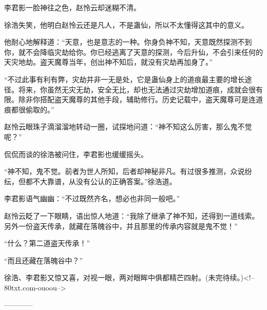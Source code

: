 \begin{this_body}
李君影一脸神往之色，赵怜云却迷糊不清。

徐浩失笑，他明白赵怜云还是凡人，不是蛊仙，所以不太懂得这其中的意义。

他耐心地解释道：“天意，也是意志的一种。你身负神不知，天意既然探测不到你，就不会降临灾劫给你。你已经逃离了天意的探测，今后升仙，不会引来任何的天灾地劫。盗天魔尊当年，创出神不知后，就没有灾劫再加身了。”

“不过此事有利有弊，灾劫并非一无是处，它是蛊仙身上的道痕最主要的增长途径。将来，你虽然无灾无劫，安全无比，却也无法通过灾劫增加道痕，成就会很有限。除非你搭配盗天魔尊的其他手段，辅助修行。历史记载中，盗天魔尊可是连道痕都很偷取的。”

赵怜云眼珠子滴溜溜地转动一圈，试探地问道：“神不知这么厉害，那么鬼不觉呢？”

侃侃而谈的徐浩被问住，李君影也缓缓摇头。

“神不知，鬼不觉。前者为世人所知，后者却神秘非凡。有过很多推测，众说纷纭，但都不大靠谱，从没有公认的正确答案。”徐浩道。

李君影语气幽幽：“不过既然齐名，想必也非同一般吧。”

赵怜云眨了一下眼睛，语出惊人地道：“我除了继承了神不知，还得到一道线索。另外一份盗天传承，就藏在落魄谷中，并且那里的传承内容就是鬼不觉！”

“什么？第二道盗天传承！”

“而且还藏在落魄谷中？”

徐浩、李君影又惊又喜，对视一眼，两对眼眸中俱都精芒四射。(未完待续。)<!--80txt.com-ouoou-->

------------

\end{this_body}

